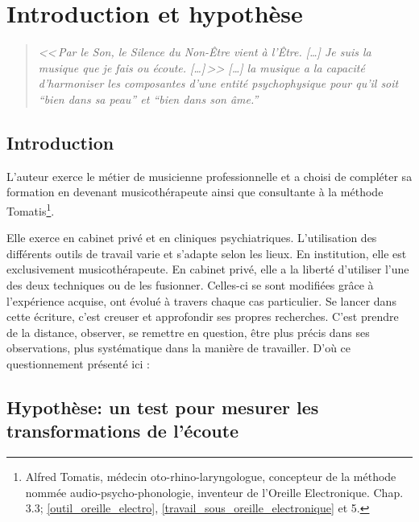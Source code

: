 \chapter{Introduction et hypothèse}
\label{jeSuisLaMusique:viret}
\begin{quotation}
\emph{<<\,\emph{Par le Son, le Silence du Non-Être vient à l'Être}. [\dots] 
\textsl{Je suis}
	\emph{la musique que je fais ou écoute}. [\dots]\,>>
[\ldots] \emph{la musique a la capacité d'harmoniser
les composantes d'une entité psychophysique pour qu'il soit ``bien
dans sa peau'' et ``bien dans son âme.}''}\, \autocite[ch. 1,  p. 8]{viret:b}
\end{quotation}

\section{Introduction}

L'auteur exerce le métier de musicienne professionnelle et a  choisi de 
compléter sa formation en devenant musicothérapeute  ainsi que consultante à la 
méthode Tomatis\footnote{Alfred Tomatis, médecin oto-rhino-laryngologue, 
concepteur de la méthode nommée audio-psycho-phonologie, inventeur de l'Oreille 
Electronique.  Chap. 3.3; \ref{outil_oreille_electro},
 \ref{travail_sous_oreille_electronique} et 5.}.  



Elle exerce en cabinet privé et en cliniques psychiatriques. L'utilisation des 
différents outils de travail varie et s'adapte selon les lieux. En institution, 
elle est exclusivement musicothérapeute. En cabinet
privé, elle a la liberté d'utiliser l'une des deux techniques ou de les 
fusionner. Celles-ci se sont modifiées grâce à  l'expérience acquise, ont 
évolué  
à travers chaque cas particulier.
 Se lancer dans cette écriture, c'est creuser et approfondir ses propres 
recherches. C'est prendre de la distance, observer, se remettre en question, 
être plus précis dans ses observations, plus systématique dans la manière de 
travailler. D'où ce questionnement présenté ici : 


\section{Hypothèse: un test pour mesurer les trans\-for\-ma\-tions de l'écoute}

